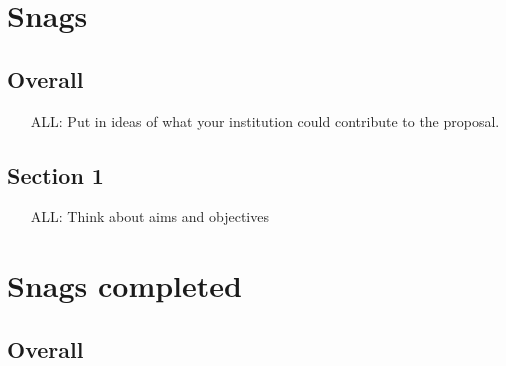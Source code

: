 \newpage
\section*{Snags}

\subsection*{Overall}

\begin{itemize}
\item[ALL:]
Put in ideas of what your institution could contribute to the
proposal.
\end{itemize}

\subsection*{Section 1}

\begin{itemize}
\item[ALL:]
  Think about aims and objectives
\end{itemize}



\newpage
\section*{Snags completed}

\subsection*{Overall}
\newpage

